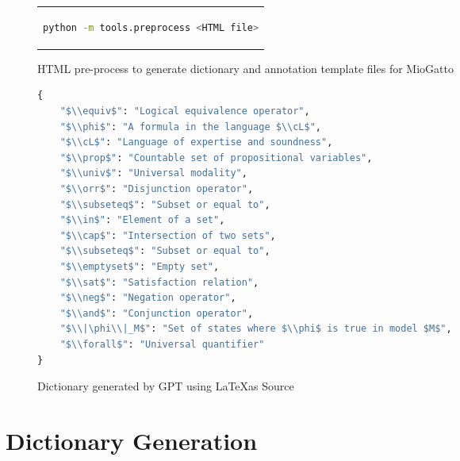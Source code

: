 \begin{figure}[htpb]
  \centering
  \begin{tabular}{c}
  \begin{lstlisting}[language=bash]
    python -m tools.preprocess <HTML file>
  \end{lstlisting}
  \end{tabular}
  \caption[html pre-processing for MioGatto]{HTML pre-process to generate dictionary and annotation template files for MioGatto}\label{fig:preprocess-htmlpreprocess}
\end{figure}

\begin{figure}[htpb]
  \centering
  \begin{lstlisting}[language=python]
{    
    "$\\equiv$": "Logical equivalence operator",
    "$\\phi$": "A formula in the language $\\cL$",
    "$\\cL$": "Language of expertise and soundness",
    "$\\prop$": "Countable set of propositional variables",
    "$\\univ$": "Universal modality",
    "$\\orr$": "Disjunction operator",
    "$\\subseteq$": "Subset or equal to",
    "$\\in$": "Element of a set",
    "$\\cap$": "Intersection of two sets",
    "$\\subseteq$": "Subset or equal to",
    "$\\emptyset$": "Empty set",
    "$\\sat$": "Satisfaction relation",
    "$\\neg$": "Negation operator",
    "$\\and$": "Conjunction operator",
    "$\\|\phi\\|_M$": "Set of states where $\\phi$ is true in model $M$",
    "$\\forall$": "Universal quantifier"
}
  \end{lstlisting}
  \caption[GPT Dictionary from LaTeX]{Dictionary generated by GPT using \LaTeX \space as Source}\label{fig:latex-dict}
\end{figure}


\section{Dictionary Generation}\label{sec:dic-generation}

